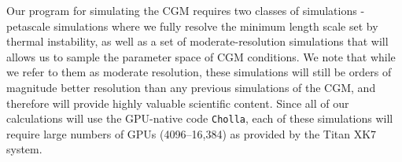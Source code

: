 \documentclass[11pt,letterpaper,english]{article}
\begin{document}




Our program for simulating the CGM requires two classes of simulations - petascale simulations where we fully resolve the minimum length scale set by thermal instability, as well as a set of moderate-resolution simulations that will allows us to sample the parameter space of CGM conditions. We note that while we refer to them as moderate resolution, these simulations will still be orders of magnitude better resolution than any previous simulations of the CGM, and therefore will provide highly valuable scientific content. Since all of
our calculations will use the GPU-native code {\tt Cholla}, each of these simulations will require large numbers of GPUs (4096--16,384) as provided by the Titan XK7 system.
\end{document}
